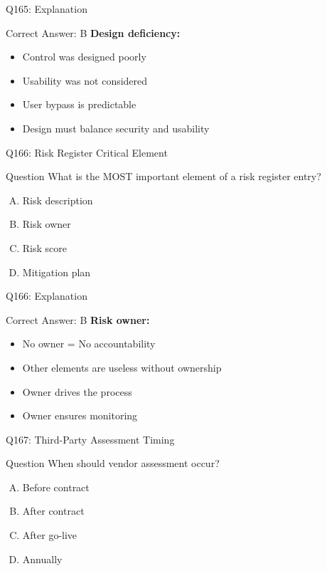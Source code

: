 \documentclass{beamer}
\begin{document}
	\begin{frame}{Q165: Explanation}
		\begin{block}{Correct Answer: B}
			\textbf{Design deficiency:}
			\begin{itemize}
				\item Control was designed poorly
				\item Usability was not considered
				\item User bypass is predictable
				\item Design must balance security and usability
			\end{itemize}
		\end{block}
	\end{frame}
	
	\begin{frame}{Q166: Risk Register Critical Element}
		\begin{block}{Question}
			What is the MOST important element of a risk register entry?
		\end{block}
		\begin{enumerate}[(A)]
			\item Risk description
			\item Risk owner
			\item Risk score
			\item Mitigation plan
		\end{enumerate}
	\end{frame}
	
	\begin{frame}{Q166: Explanation}
		\begin{block}{Correct Answer: B}
			\textbf{Risk owner:}
			\begin{itemize}
				\item No owner = No accountability
				\item Other elements are useless without ownership
				\item Owner drives the process
				\item Owner ensures monitoring
			\end{itemize}
		\end{block}
	\end{frame}
	
	\begin{frame}{Q167: Third-Party Assessment Timing}
		\begin{block}{Question}
			When should vendor assessment occur?
		\end{block}
		\begin{enumerate}[(A)]
			\item Before contract
			\item After contract
			\item After go-live
			\item Annually
		\end{enumerate}
	\end{frame}
	
\end{document}
